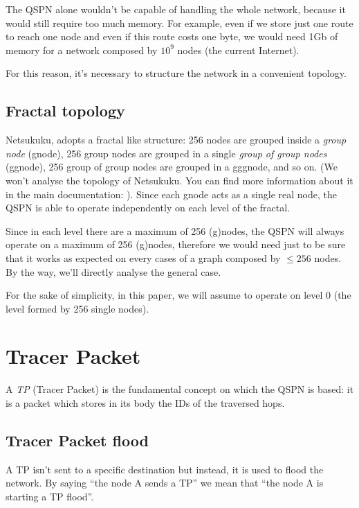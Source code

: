 \documentclass[a4paper]{article}
\begin{document}
The QSPN alone wouldn't be capable of handling the whole network, because it
would still require too much memory. For example, even if we store just one
route to reach one node and even if this route costs one byte, we would need
1Gb of memory for a network composed by $10^9$ nodes (the current Internet).

For this reason, it's necessary to structure the network in a convenient
topology.

\subsection{Fractal topology}
\label{sec:fractal_topology}
Netsukuku, adopts a fractal like structure:
256 nodes are grouped inside a \emph{group node} (gnode), 256 group nodes are grouped
in a single \emph{group of group nodes} (ggnode), 256 group of group nodes are
grouped in a gggnode, and so on.
(We won't analyse the topology of Netsukuku. You can find more information
about it in the main documentation: \cite{ntksite}).
\newline
Since each gnode acts as a single real node,
the QSPN is able to operate independently on each level of the fractal.

Since in each level there are a maximum of 256 (g)nodes, the QSPN will
always operate on a maximum of 256 (g)nodes, therefore we would need just to
be sure that it works as expected on every cases of a graph composed by $\le
256$ nodes. By the way, we'll directly analyse the general case.

For the sake of simplicity, in this paper, we will assume to operate on level
0 (the level formed by 256 single nodes).

\section{Tracer Packet}
\label{sec:TP}

A \emph{TP} (Tracer Packet) is the fundamental concept on which the QSPN is
based: 
it is a packet which stores in its body the IDs of the traversed hops.

\subsection{Tracer Packet flood}
\label{sec:TP_flood}

A TP isn't sent to a specific destination but instead, it is used to flood the
network. By saying ``the node A sends a TP'' we mean that ``the node A is
starting a TP flood''.
\end{document}
